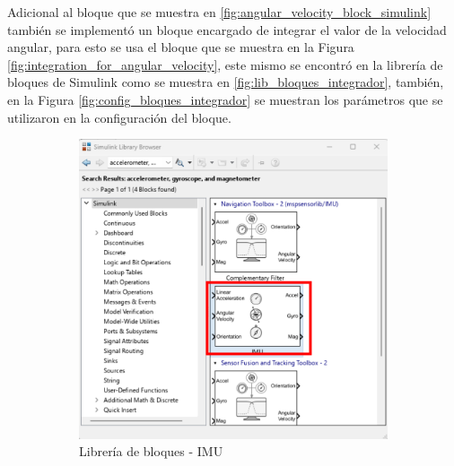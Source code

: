 Adicional al bloque que se muestra en \ref{fig:angular_velocity_block_simulink} también se implementó un bloque encargado de integrar el valor de la velocidad angular, para esto se usa el bloque que se muestra en la Figura \ref{fig:integration_for_angular_velocity}, este mismo se encontró en la librería de bloques de Simulink como se muestra en \ref{fig:lib_bloques_integrador}, también, en la Figura \ref{fig:config_bloques_integrador} se muestran los parámetros que se utilizaron en la configuración del bloque.
\newpage

\begin{figure}[htbp]
    \centering
    \begin{subfigure}[b]{0.35\textwidth}
        \centering
        \includegraphics[width=\textwidth]{fig/Capitulo5/Caso_de_estudio_IMU/Generador_de_archivos/libreria_de_bloques_IMU.pdf}
        \caption{Librería de bloques - IMU}
        \label{fig:lib_bloques_IMU}
    \end{subfigure}
    \hfill
    \begin{subfigure}[b]{0.35\textwidth}
        \centering

\end{subfigure}
\end{figure}
